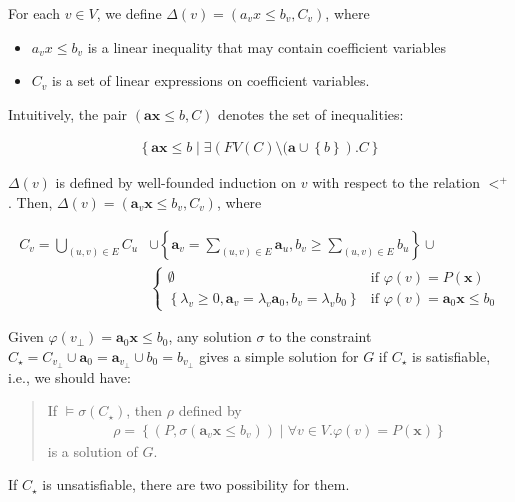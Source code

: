\documentclass[a4paper,12pt]{article}
\begin{document}
For each $v \in V$, we define $\Delta(v) = (a_v x \leq b_v, C_v)$,
where
\begin{itemize}
\item $a_v x \leq b_v$ is a linear inequality that may contain
  coefficient variables
\item $C_v$ is a set of linear expressions on coefficient variables.
\end{itemize}
Intuitively, the pair $(\mathbf{a} \mathbf{x} \leq b, C)$ denotes the
set of inequalities:

\begin{align*}
\left\lbrace
 \mathbf{a} \mathbf{x} \leq b \middle|
 \exists \left( FV(C)
  \setminus (\mathbf{a} \cup \left\lbrace b \right\rbrace
 \right). C
\right\rbrace
\end{align*}

$\Delta(v)$ is defined by well-founded induction on $v$ with respect
to the relation $<^+$. Then,
$\Delta(v) = \left( \mathbf{a}_v \mathbf{x} \leq b_v, C_v \right)$,
where

\begin{align*}
C_v =
\bigcup_{(u,v) \in E} C_u & \cup
\left\lbrace
 \mathbf{a}_v = \sum_{(u,v) \in E} \mathbf{a}_u,
 b_v \geq \sum_{(u,v) \in E} b_u
\right\rbrace \cup
\\
& \begin{cases}
\emptyset
& \mbox{if } \varphi(v) = P(\mathbf{x}) \\
\left\lbrace
 \lambda_v \geq 0, \mathbf{a}_v = \lambda_v \mathbf{a}_0,
 b_v = \lambda_v b_0
\right\rbrace
& \mbox{if } \varphi(v) = \mathbf{a}_0 \mathbf{x} \leq b_0
\end{cases}
\end{align*}

Given $\varphi(v_\bot) = \mathbf{a}_0 \mathbf{x} \leq b_0$, any
solution $\sigma$ to the constraint $C_\star = C_{v_\bot} \cup {
  \mathbf{a}_0 = \mathbf{a}_{v_\bot} } \cup { b_0 = b_{v_\bot} }$
gives a simple solution for $G$ if $C_\star$ is satisfiable, i.e., we
should have:

\begin{quote}
If $\models \sigma(C_\star)$, then $\rho$ defined by
\begin{align*}
 \rho = \left\lbrace
  \left( P, \sigma(\mathbf{a}_v \mathbf{x} \leq b_v) \right) \middle|
  \forall v \in V. \varphi(v) = P(\mathbf{x})
 \right\rbrace
\end{align*}
is a solution of $G$.
\end{quote}

If $C_\star$ is unsatisfiable, there are two possibility for them.
\end{document}
